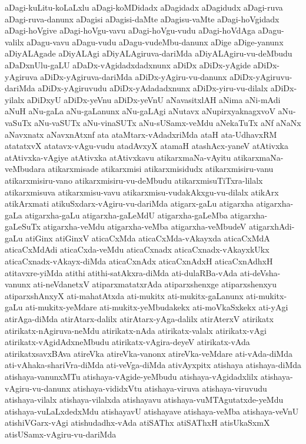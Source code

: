 {aDagi-kuLitu-koLaLxlu
aDagi-koMDidadx
aDagidadx
aDagidudx
aDagi-ruva
aDagi-ruva-danunx
aDagisi
aDagisi-daMte
aDagisu-vaMte
aDagi-hoVgidadx
aDagi-hoVgive
aDagi-hoVgu-vavu
aDagi-hoVgu-vudu
aDagi-hoVdAga
aDagu-valilx
aDagu-vavu
aDagu-vudu
aDagu-vudeMbu-danunx
aDige
aDige-yanunx
aDiyALAgade
aDiyALAgi
aDiyALAgiruva-dariMda
aDiyALAgiru-vu-deMbudu
aDaDxnUlu-gaLU
aDaDx-vAgidadxdadxnunx
aDiDx
aDiDx-yAgide
aDiDx-yAgiruva
aDiDx-yAgiruva-dariMda
aDiDx-yAgiru-vu-danunx
aDiDx-yAgiruvu-dariMda
aDiDx-yAgiruvudu
aDiDx-yAdadadxnunx
aDiDx-yiru-vu-dilalx
aDiDx-yilalx
aDiDxyU
aDiDx-yeVnu
aDiDx-yeVnU
aNavasitxlAH
aNima
aNi-mAdi
aNuH
aNu-gaLa
aNu-gaLanunx
aNu-gaLAgi
aNutavx
aNupirxyaknagxvoV
aNu-vaSuTx
aNu-vaSUTx
aNu-vinaSUTx
aNu-sUSamx-veMdu
aNekaTuTx
aNf
aNaNx
aNavxnatx
aNavxnAtxnf
ata
ataMtarx-vAdadxriMda
ataH
ata-UdhavxRM
atatatxvX
atatavx-vAgu-vudu
atadAvxyX
atamaH
atashAcx-yaneV
atAtivxka
atAtivxka-vAgiye
atAtivxka
atAtivxkavu
atikarxmaNa-vAyitu
atikarxmaNa-veMbudara
atikarxmisade
atikarxmisi
atikarxmisidudx
atikarxmisiru-vanu
atikarxmisiru-vano
atikarxmisiru-vu-deMbudu
atikarxmisuTiTxra-lilalx
atikarxmisuva
atikarxmisu-vavu
atikarxmisu-vudakAkxgu-vu-dilalx
atikArx
atikArxmati
atikuSxdarx-vAgiru-vu-dariMda
atigarx-gaLu
atigarxha
atigarxha-gaLa
atigarxha-gaLu
atigarxha-gaLeMdU
atigarxha-gaLeMba
atigarxha-gaLeSuTx
atigarxha-veMdu
atigarxha-veMba
atigarxha-veMbudeV
atigarxhAdi-gaLu
atiGinx
atiGinxV
aticaCxMda
aticaCxMda-vAkayxda
aticaCxMdA
aticaCxMdAdi
aticaCxda-veMdu
aticaCxnadx
aticaCxnadx-vAkayxkUkx
aticaCxnadx-vAkayx-diMda
aticaCxnAdx
aticaCxnAdxH
aticaCxnAdhxH
atitavxre-yiMda
atithi
atithi-satAkxra-diMda
ati-dulaRBa-vAda
ati-deVsha-vanunx
ati-neVdanetxV
atiparxmatatxrAda
atiparxshenxge
atiparxshenxyu
atiparxshAnxyX
ati-mahatAtxda
ati-mukitx
ati-mukitx-gaLanunx
ati-mukitx-gaLu
ati-mukitx-yeMdare
ati-mukitx-yeMbudakekx
ati-moVkaSxkekx
ati-yAgi
atirAga-diMda
atirAtarx-dalilx
atirAtarx-yAga-dalilx
atirAterxV
atirikatx
atirikatx-nAgiruva-neMdu
atirikatx-nAda
atirikatx-valalx
atirikatx-vAgi
atirikatx-vAgidAdxneMbudu
atirikatx-vAgira-deyeV
atirikatx-vAda
atirikatxsavxBAva
atireVka
atireVka-vanonx
atireVka-veMdare
ati-vAda-diMda
ati-vAhaka-shariVra-diMda
ati-veVga-diMda
ativAyxpitx
atishaya
atishaya-diMda
atishaya-vanunxMTu
atishaya-vAgide-yeMbudu
atishaya-vAgidadxlilx
atishaya-vAgiru-vu-danunx
atishaya-vididxVtu
atishaya-viruva
atishaya-viruvudu
atishaya-vilalx
atishaya-vilalxda
atishayavu
atishaya-vuMTAgutatxde-yeMdu
atishaya-vuLaLxdedxMdu
atishayavU
atishayave
atishaya-veMba
atishaya-veVnU
atishiVGarx-vAgi
atishudadhx-vAda
atiSAThx
atiSAThxH
atisUkaSxmX
atisUSamx-vAgiru-vu-dariMda
}
